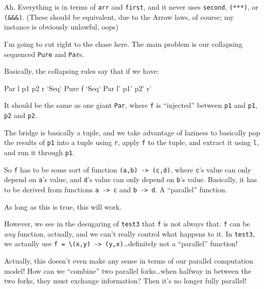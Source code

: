 \documentclass[]{article}
\newenvironment{Shaded}{}{}
\newcommand{\DataTypeTok}[1]{\textcolor[rgb]{0.56,0.13,0.00}{#1}}
\newcommand{\OtherTok}[1]{\textcolor[rgb]{0.00,0.44,0.13}{#1}}
\newcommand{\NormalTok}[1]{#1}
\begin{document}
Ah. Everything is in terms of \texttt{arr} and \texttt{first}, and it never uses
\texttt{second}, \texttt{(***)}, or \texttt{(\&\&\&)}. (These should be
equivalent, due to the Arrow laws, of course; my instance is obviously unlawful,
oops)

I'm going to cut right to the chase here. The main problem is our collapsing
sequenced \texttt{Pure} and \texttt{Par}s.

Basically, the collapsing rules say that if we have:

\begin{Shaded}
\begin{Highlighting}[]
\DataTypeTok{Par}\NormalTok{ l p1 p2 r }\OtherTok{`Seq`} \DataTypeTok{Pure}\NormalTok{ f }\OtherTok{`Seq`} \DataTypeTok{Par}\NormalTok{ l' p1' p2' r'}
\end{Highlighting}
\end{Shaded}

It should be the same as one giant \texttt{Par}, where \texttt{f} is
``injected'' between \texttt{p1} and \texttt{p1\textquotesingle{}}, \texttt{p2}
and \texttt{p2\textquotesingle{}}.

The bridge is basically a tuple, and we take advantage of laziness to basically
pop the results of \texttt{p1} into a tuple using \texttt{r}, apply \texttt{f}
to the tuple, and extract it using \texttt{l}, and run it through
\texttt{p1\textquotesingle{}}.

So \texttt{f} has to be some sort of function
\texttt{(a,b)\ -\textgreater{}\ (c,d)}, where \texttt{c}'s value can only depend
on \texttt{a}'s value, and \texttt{d}'s value can only depend on \texttt{b}'s
value. Basically, it has to be derived from functions
\texttt{a\ -\textgreater{}\ c} and \texttt{b\ -\textgreater{}\ d}. A
``parallel'' function.

As long as this is true, this will work.

However, we see in the desugaring of \texttt{test3} that \texttt{f} is not
always that. \texttt{f} can be \emph{any} function, actually, and we can't
really control what happens to it. In \texttt{test3}, we actaully use
\texttt{f\ =\ \textbackslash{}(x,y)\ -\textgreater{}\ (y,x)}\ldots{}definitely
not a ``parallel'' function!

Actually, this doesn't even make any sense in terms of our parallel computation
model! How can we ``combine'' two parallel forks\ldots{}when halfway in between
the two forks, they must exchange information? Then it's no longer fully
parallel!
\end{document}
